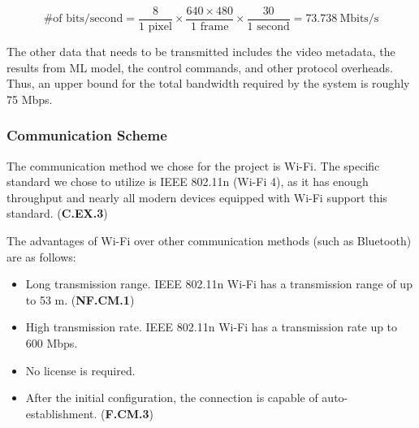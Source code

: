 $$
\text{\# of bits/second} = \frac{8}{\text{1 pixel}} \times \frac{640\times 480}{\text{1 frame}} \times \frac{30}{\text{1 second}} = 73.738~\text{Mbits/s}
$$

The other data that needs to be transmitted includes the video metadata, the results from ML model, the control commands, and other protocol overheads. Thus, an upper bound for the total bandwidth required by the system is roughly 75 Mbps.

\subsubsection{Communication Scheme}

The communication method we chose for the project is Wi-Fi. The specific standard we chose to utilize is IEEE 802.11n (Wi-Fi 4), as it has enough throughput and nearly all modern devices equipped with Wi-Fi support this standard. (\textbf{C.EX.3})

The advantages of Wi-Fi over other communication methods (such as Bluetooth) are as follows:
\begin{itemize}
    \item Long transmission range. IEEE 802.11n Wi-Fi has a transmission range of up to 53 m. (\textbf{NF.CM.1})
    \item High transmission rate. IEEE 802.11n Wi-Fi has a transmission rate up to 600 Mbps.
    \item No license is required.
    \item After the initial configuration, the connection is capable of auto-establishment. (\textbf{F.CM.3})
\end{itemize}